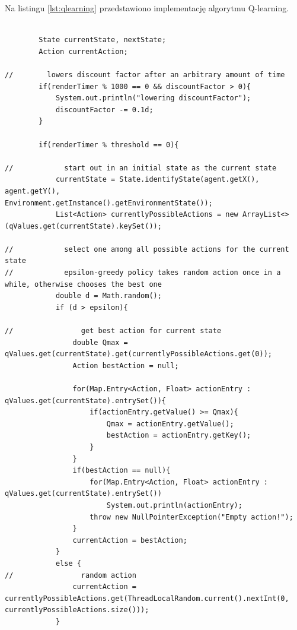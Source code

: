 Na listingu \ref{lst:qlearning} przedstawiono implementację algorytmu Q-learning.

\begin{lstlisting}[caption=Implementacja algorytmu Q-learning, label={lst:qlearning}, captionpos=b, 
belowcaptionskip=4pt]

        State currentState, nextState;
        Action currentAction;

//        lowers discount factor after an arbitrary amount of time
        if(renderTimer % 1000 == 0 && discountFactor > 0){
            System.out.println("lowering discountFactor");
            discountFactor -= 0.1d;
        }

        if(renderTimer % threshold == 0){

//            start out in an initial state as the current state
            currentState = State.identifyState(agent.getX(), agent.getY(), 
Environment.getInstance().getEnvironmentState());
            List<Action> currentlyPossibleActions = new ArrayList<>(qValues.get(currentState).keySet());

//            select one among all possible actions for the current state
//            epsilon-greedy policy takes random action once in a while, otherwise chooses the best one
            double d = Math.random();
            if (d > epsilon){

//                get best action for current state
                double Qmax = qValues.get(currentState).get(currentlyPossibleActions.get(0));
                Action bestAction = null;

                for(Map.Entry<Action, Float> actionEntry : qValues.get(currentState).entrySet()){
                    if(actionEntry.getValue() >= Qmax){
                        Qmax = actionEntry.getValue();
                        bestAction = actionEntry.getKey();
                    }
                }
                if(bestAction == null){
                    for(Map.Entry<Action, Float> actionEntry : qValues.get(currentState).entrySet())
                        System.out.println(actionEntry);
                    throw new NullPointerException("Empty action!");
                }
                currentAction = bestAction;
            }
            else {
//                random action
                currentAction = currentlyPossibleActions.get(ThreadLocalRandom.current().nextInt(0, 
currentlyPossibleActions.size()));
            }


\end{lstlisting}
